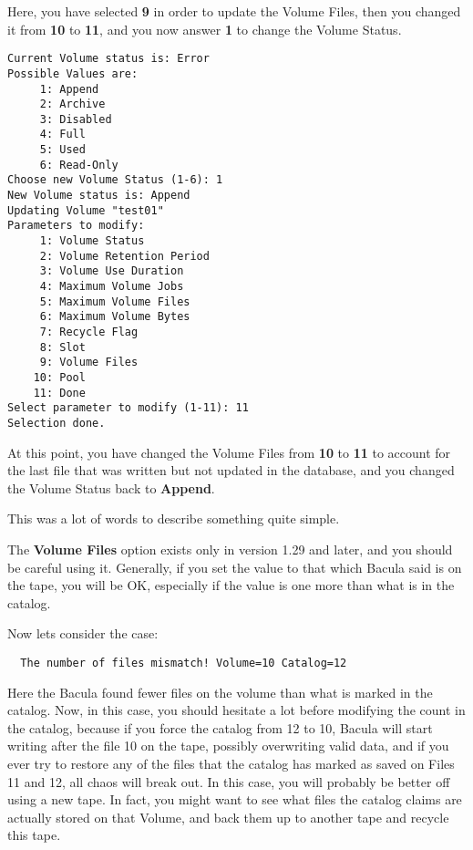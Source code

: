 Here, you have selected {\bf 9} in order to update the Volume Files, then you
changed it from {\bf 10} to {\bf 11}, and you now answer {\bf 1} to change the
Volume Status.

\footnotesize
\begin{verbatim}
Current Volume status is: Error
Possible Values are:
     1: Append
     2: Archive
     3: Disabled
     4: Full
     5: Used
     6: Read-Only
Choose new Volume Status (1-6): 1
New Volume status is: Append
Updating Volume "test01"
Parameters to modify:
     1: Volume Status
     2: Volume Retention Period
     3: Volume Use Duration
     4: Maximum Volume Jobs
     5: Maximum Volume Files
     6: Maximum Volume Bytes
     7: Recycle Flag
     8: Slot
     9: Volume Files
    10: Pool
    11: Done
Select parameter to modify (1-11): 11
Selection done.
\end{verbatim}
\normalsize

At this point, you have changed the Volume Files from {\bf 10} to {\bf 11} to
account for the last file that was written but not updated in the database,
and you changed the Volume Status back to {\bf Append}.

This was a lot of words to describe something quite simple.

The {\bf Volume Files} option exists only in version 1.29 and later, and you
should be careful using it. Generally, if you set the value to that which
Bacula said is on the tape, you will be OK, especially if the value is one
more than what is in the catalog.

Now lets consider the case:

\footnotesize
\begin{verbatim}
  The number of files mismatch! Volume=10 Catalog=12
\end{verbatim}
\normalsize

Here the Bacula found fewer files on the volume than what is marked in the
catalog. Now, in this case, you should hesitate a lot before modifying the count
in the catalog, because if you force the catalog from 12 to 10, Bacula will
start writing after the file 10 on the tape, possibly overwriting valid data,
and if you ever try to restore any of the files that the catalog has marked as
saved on Files 11 and 12, all chaos will break out. In this case, you will
probably be better off using a new tape. In fact, you might want to see what
files the catalog claims are actually stored on that Volume, and back them up
to another tape and recycle this tape.

